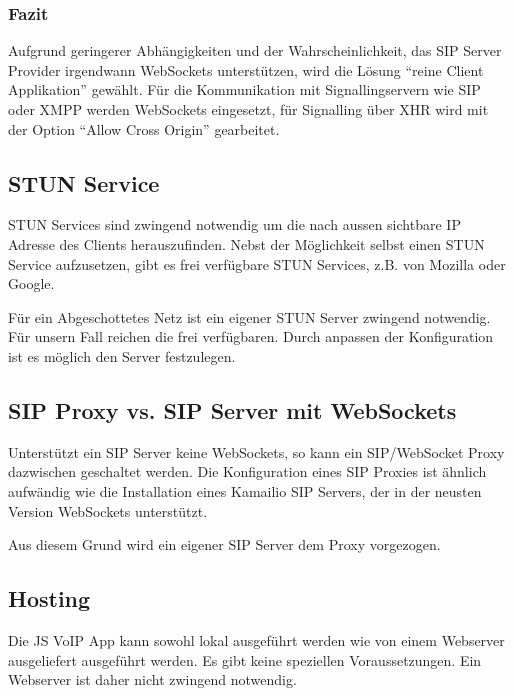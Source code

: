 		\subsubsection{Fazit}
			Aufgrund geringerer Abhängigkeiten und der Wahrscheinlichkeit, das SIP Server Provider irgendwann WebSockets unterstützen, wird die Lösung ``reine Client Applikation'' gewählt.
			Für die Kommunikation mit Signallingservern wie SIP oder XMPP werden WebSockets eingesetzt, für Signalling über XHR wird mit der Option ``Allow Cross Origin'' gearbeitet.

	\subsection{STUN Service}
		STUN Services sind zwingend notwendig um die nach aussen sichtbare IP Adresse des Clients herauszufinden. Nebst der Möglichkeit selbst einen STUN Service aufzusetzen, gibt es frei verfügbare STUN Services, z.B. von Mozilla oder Google.


		Für ein Abgeschottetes Netz ist ein eigener STUN Server zwingend notwendig. Für unsern Fall reichen die frei verfügbaren. Durch anpassen der Konfiguration ist es möglich den Server festzulegen.


	\subsection{SIP Proxy vs. SIP Server mit WebSockets}
		Unterstützt ein SIP Server keine WebSockets, so kann ein SIP/WebSocket Proxy dazwischen geschaltet werden. Die Konfiguration eines SIP Proxies ist ähnlich aufwändig wie die Installation eines Kamailio SIP Servers, der in der neusten Version WebSockets unterstützt.


		Aus diesem Grund wird ein eigener SIP Server dem Proxy vorgezogen.


	\subsection{Hosting}
		Die JS VoIP App kann sowohl lokal ausgeführt werden wie von einem Webserver ausgeliefert ausgeführt werden. Es gibt keine speziellen Voraussetzungen. Ein Webserver ist daher nicht zwingend notwendig.
	
